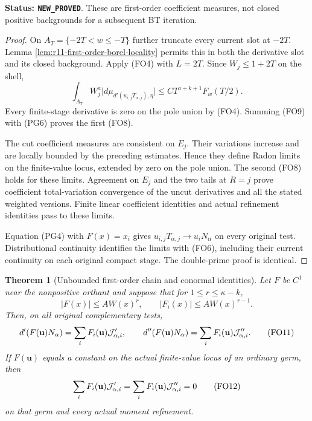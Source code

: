 \documentclass[11pt,a4paper]{article}
\numberwithin{equation}{section}
\newtheorem{theorem}{Theorem}[section]
\theoremstyle{definition}
\theoremstyle{remark}
\begin{document}
\noindent\textbf{Status: \texttt{NEW\_PROVED}}.
These are first-order coefficient measures, not closed
positive backgrounds for a subsequent BT iteration.

\begin{proof}
On $A_T=\{-2T<w\leq-T\}$ further truncate every current
slot at $-2T$. Lemma
\ref{lem:r11-first-order-borel-locality} permits this in
both the derivative slot and its closed background.
Apply (FO4) with $L=2T$. Since $W_j\leq1+2T$ on the shell,
\[
 \int_{A_T}W_j^a
       \bigl|d\mu_{d'(u_{i,j}T_{\alpha,j}),\eta}\bigr|
                    \leq C T^{a+k+1}F_w(T/2).
 \tag{FO9}
\]
Every finite-stage derivative is zero on the pole union
by (FO4). Summing (FO9) with (PG6) proves the first (FO8).

The cut coefficient measures are consistent on $E_j$.
Their variations increase and are locally bounded by
the preceding estimates. Hence they define Radon limits
on the finite-value locus, extended by zero on the
pole union. The second (FO8) holds for these limits.
Agreement on $E_j$ and the two tails at $R=j$ prove
coefficient total-variation convergence of the uncut
derivatives and all the stated weighted versions.
Finite linear coefficient identities and actual
refinement identities pass to these limits.

Equation (PG4) with $F(x)=x_i$ gives
$u_{i,j}T_{\alpha,j}\to u_iN_\alpha$ on every original
test. Distributional continuity identifies the limits
with (FO6), including their current continuity on
each original compact stage. The double-prime proof
is identical.
\end{proof}

\begin{theorem}[Unbounded first-order chain and conormal identities]
\label{thm:r11-unbounded-first-order-chain}
Let $F$ be $C^1$ near the nonpositive orthant and suppose
that for $1\leq r\leq\kappa-k$,
\[
 |F(x)|\leq A W(x)^r,\qquad
 |F_i(x)|\leq A W(x)^{r-1}.
 \tag{FO10}
\]
Then, on all original complementary tests,
\[
 d'(F(\mathbf u)N_\alpha)
                  =\sum_iF_i(\mathbf u){\cal J}'_{\alpha,i},
 \qquad
 d''(F(\mathbf u)N_\alpha)
                  =\sum_iF_i(\mathbf u){\cal J}''_{\alpha,i}.
 \tag{FO11}
\]
If $F(\mathbf u)$ equals a constant on the actual
finite-value locus of an ordinary germ, then
\[
       \sum_iF_i(\mathbf u){\cal J}'_{\alpha,i}
       =\sum_iF_i(\mathbf u){\cal J}''_{\alpha,i}=0
 \tag{FO12}
\]
on that germ and every actual moment refinement.
\end{theorem}
\end{document}
